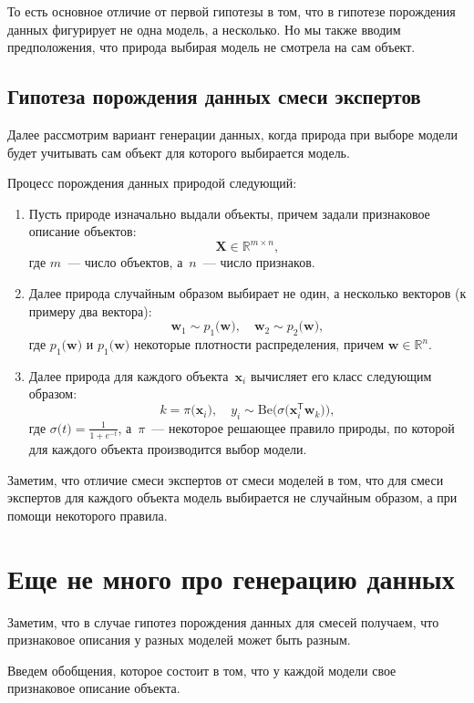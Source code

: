 \documentclass[12pt, twoside]{article}
\numberwithin{equation}{section}
\begin{document}
То есть основное отличие от первой гипотезы в том, что в гипотезе порождения данных фигурирует не одна модель, а несколько. Но мы также вводим предположения, что природа выбирая модель не смотрела на сам объект.

\subsection{Гипотеза порождения данных смеси экспертов}
Далее рассмотрим вариант генерации данных, когда природа при выборе модели будет учитывать сам объект для которого выбирается модель.

Процесс порождения данных природой следующий:
\begin{enumerate}
	\item Пусть природе изначально выдали объекты, причем задали признаковое описание объектов:
\[
\mathbf{X} \in \mathbb{R}^{m\times n},
\]
где $m$~--- число объектов, а~$n$~--- число признаков.

	\item Далее природа случайным образом выбирает не один, а несколько векторов (к примеру два вектора):
\[
\mathbf{w}_1 \sim p_1\bigr(\mathbf{w}\bigr), \quad \mathbf{w}_2 \sim p_2\bigr(\mathbf{w}\bigr),
\]
где $p_1\bigr(\mathbf{w}\bigr)$ и $p_1\bigr(\mathbf{w}\bigr)$ некоторые плотности распределения, причем $\mathbf{w}\in \mathbb{R}^{n}$.

	\item Далее природа для каждого объекта~$\mathbf{x}_i$ вычисляет его класс следующим образом:
	\[
	k = \pi\bigr(\mathbf{x}_i\bigr), \quad y_i \sim \text{Be}\bigr(\sigma\bigr(\mathbf{x}_i^{\mathsf{T}}\mathbf{w}_k\bigr)\bigr),
	\]
	где $\sigma\bigr(t\bigr) = \frac{1}{1+e^{-t}}$, а~$\pi$~--- некоторое решающее правило природы, по которой для каждого объекта производится выбор модели.
\end{enumerate}

Заметим, что отличие смеси экспертов от смеси моделей в том, что для смеси экспертов для каждого объекта модель выбирается не случайным образом, а при помощи некоторого правила.

\section{Еще не много про генерацию данных}
Заметим, что в случае гипотез порождения данных для смесей получаем, что признаковое описания у разных моделей может быть разным.

Введем обобщения, которое состоит в том, что у каждой модели свое признаковое описание объекта.
\end{document}
